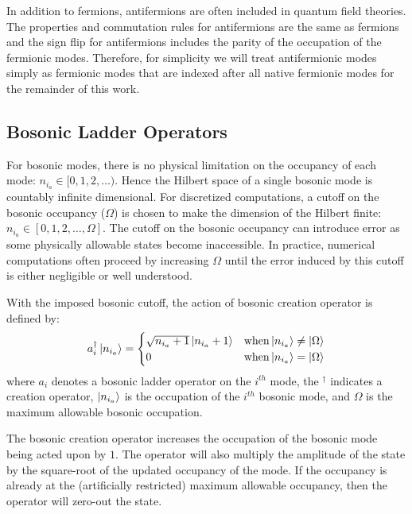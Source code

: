 In addition to fermions, antifermions are often included in quantum field theories.
The properties and commutation rules for antifermions are the same as fermions and the sign flip for antifermions includes the parity of the occupation of the fermionic modes.
Therefore, for simplicity we will treat antifermionic modes simply as fermionic modes that are indexed after all native fermionic modes for the remainder of this work.

\subsection{Bosonic Ladder Operators}
\label{subsec:bosonic-ladder}

For bosonic modes, there is no physical limitation on the occupancy of each mode: $n_{i_a} \in [0, 1, 2, \dots)$.
Hence the Hilbert space of a single bosonic mode is countably infinite dimensional. 
For discretized computations, a cutoff on the bosonic occupancy ($\Omega$) is chosen to make the dimension of the Hilbert finite: $n_{i_a} \in [0, 1, 2, \dots, \Omega]$.
The cutoff on the bosonic occupancy can introduce error as some physically allowable states become inaccessible.
In practice, numerical computations often proceed by increasing $\Omega$ until the error induced by this cutoff is either negligible or well understood.

With the imposed bosonic cutoff, the action of bosonic creation operator is defined by:
\begin{equation}
    \label{eq:bosonic-creation}
    a_i^\dagger \ket{n_{i_a}} = 
    \begin{cases} 
        \sqrt{n_{i_a} + 1} \ket{n_{i_a} + 1}  & {\rm when} \ket{n_{i_a}} \neq \ket{\Omega} \\
        0 & {\rm when} \ket{n_{i_a}} = \ket{\Omega}
    \end{cases}
\end{equation}
where $a_i$ denotes a bosonic ladder operator on the $i^{th}$ mode, the $^\dagger$ indicates a creation operator, $\ket{n_{i_a}}$ is the occupation of the $i^{th}$ bosonic mode, and $\Omega$ is the maximum allowable bosonic occupation.

The bosonic creation operator increases the occupation of the bosonic mode being acted upon by $1$.
The operator will also multiply the amplitude of the state by the square-root of the updated occupancy of the mode.
If the occupancy is already at the (artificially restricted) maximum allowable occupancy, then the operator will zero-out the state.

